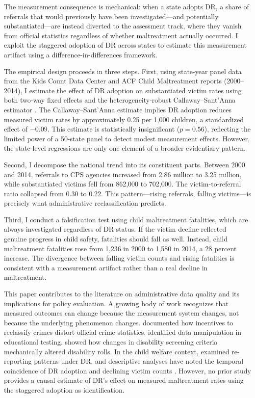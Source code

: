 \documentclass[12pt]{article}
\begin{document}
The measurement consequence is mechanical: when a state adopts DR, a share of referrals that would previously have been investigated---and potentially substantiated---are instead diverted to the assessment track, where they vanish from official statistics regardless of whether maltreatment actually occurred. I exploit the staggered adoption of DR across states to estimate this measurement artifact using a difference-in-differences framework.

The empirical design proceeds in three steps. First, using state-year panel data from the Kids Count Data Center and ACF Child Maltreatment reports (2000--2014), I estimate the effect of DR adoption on substantiated victim rates using both two-way fixed effects and the heterogeneity-robust Callaway--Sant'Anna estimator \citep{CallawayS2021}. The Callaway--Sant'Anna estimate implies DR adoption reduces measured victim rates by approximately 0.25 per 1,000 children, a standardized effect of $-0.09$. This estimate is statistically insignificant ($p = 0.56$), reflecting the limited power of a 50-state panel to detect modest measurement effects. However, the state-level regressions are only one element of a broader evidentiary pattern.

Second, I decompose the national trend into its constituent parts. Between 2000 and 2014, referrals to CPS agencies increased from 2.86 million to 3.25 million, while substantiated victims fell from 862,000 to 702,000. The victim-to-referral ratio collapsed from 0.30 to 0.22. This pattern---rising referrals, falling victims---is precisely what administrative reclassification predicts.

Third, I conduct a falsification test using child maltreatment fatalities, which are always investigated regardless of DR status. If the victim decline reflected genuine progress in child safety, fatalities should fall as well. Instead, child maltreatment fatalities rose from 1,236 in 2000 to 1,580 in 2014, a 28 percent increase. The divergence between falling victim counts and rising fatalities is consistent with a measurement artifact rather than a real decline in maltreatment.

This paper contributes to the literature on administrative data quality and its implications for policy evaluation. A growing body of work recognizes that measured outcomes can change because the measurement system changes, not because the underlying phenomenon changes. \citet{Levitt1998} documented how incentives to reclassify crimes distort official crime statistics. \citet{JacobLevitt2003} identified data manipulation in educational testing. \citet{Autor2006} showed how changes in disability screening criteria mechanically altered disability rolls. In the child welfare context, \citet{Fluke2019} examined re-reporting patterns under DR, and descriptive analyses have noted the temporal coincidence of DR adoption and declining victim counts \citep{Merkel2006, NQIC2014}. However, no prior study provides a causal estimate of DR's effect on measured maltreatment rates using the staggered adoption as identification.
\end{document}
